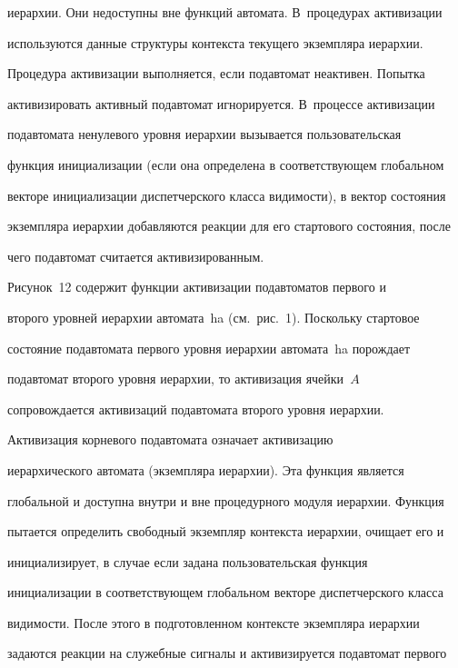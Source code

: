 иерархии. Они недоступны вне функций автомата. В~процедурах активизации 


используются данные структуры контекста текущего экземпляра иерархии. 


Процедура активизации выполняется, если подавтомат неактивен. Попытка 


активизировать активный подавтомат игнорируется. В~процессе активизации 


подавтомата ненулевого уровня иерархии вызывается пользовательская 


функция инициализации (если она определена в соответствующем глобальном 


векторе инициализации диспетчерского класса видимости), в вектор состояния 


экземпляра иерархии добавляются реакции для его стартового состояния, после 


чего подавтомат считается активизированным.


      


      Рисунок~12 содержит функции активизации подавтоматов первого и 


второго уровней иерархии автомата~ha (см.\ рис.~1). Поскольку стартовое 


состояние подавтомата первого уровня иерархии автомата~ha порождает 


подавтомат второго уровня иерархии, то активизация ячейки~$A$ 


сопровождается активизаций подавтомата второго уровня иерархии.


      


      Активизация корневого подавтомата означает активизацию 


иерархического автомата (экземпляра иерархии). Эта функция является 


глобальной и доступна внутри и вне процедурного модуля иерархии. Функция 


пытается определить свободный экземпляр контекста иерархии, очищает его и 


инициализирует, в случае если задана пользовательская функция 


инициализации в соответствующем глобальном векторе диспетчерского класса 


видимости. После этого в подготовленном контексте экземпляра иерархии 


задаются реакции на служебные сигналы и активизируется подавтомат первого 


